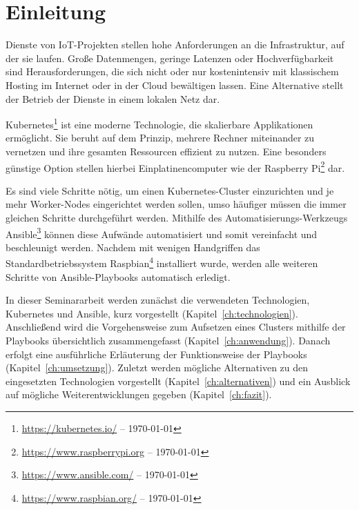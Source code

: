 \chapter{Einleitung}\label{ch:einleitung}

Dienste von IoT-Projekten stellen hohe Anforderungen an die Infrastruktur, auf der sie laufen.
Große Datenmengen, geringe Latenzen oder Hochverfügbarkeit sind Herausforderungen, die sich nicht oder nur kostenintensiv mit klassischem Hosting im Internet oder in der Cloud bewältigen lassen.
Eine Alternative stellt der Betrieb der Dienste in einem lokalen Netz dar.

Kubernetes\footnote{\url{https://kubernetes.io/} -- \today} ist eine moderne Technologie, die skalierbare Applikationen ermöglicht.
Sie beruht auf dem Prinzip, mehrere Rechner miteinander zu vernetzen und ihre gesamten Ressourcen effizient zu nutzen.
Eine besonders günstige Option stellen hierbei Einplatinencomputer wie der Raspberry Pi\footnote{\url{https://www.raspberrypi.org} -- \today} dar.

Es sind viele Schritte nötig, um einen Kubernetes-Cluster einzurichten und je mehr Worker-Nodes eingerichtet werden sollen, umso häufiger müssen die immer gleichen Schritte durchgeführt werden.
Mithilfe des Automatisierungs-Werkzeugs Ansible\footnote{\url{https://www.ansible.com/} -- \today} können diese Aufwände automatisiert und somit vereinfacht und beschleunigt werden.
Nachdem mit wenigen Handgriffen das Standardbetriebssystem Raspbian\footnote{\url{https://www.raspbian.org/} -- \today} installiert wurde, werden alle weiteren Schritte von Ansible-Playbooks automatisch erledigt.

In dieser Seminararbeit werden zunächst die verwendeten Technologien, Kubernetes und Ansible, kurz vorgestellt (Kapitel~\ref{ch:technologien}).
Anschließend wird die Vorgehensweise zum Aufsetzen eines Clusters mithilfe der Playbooks übersichtlich zusammengefasst (Kapitel~\ref{ch:anwendung}).
Danach erfolgt eine ausführliche Erläuterung der Funktionsweise der Playbooks (Kapitel~\ref{ch:umsetzung}).
Zuletzt werden mögliche Alternativen zu den eingesetzten Technologien vorgestellt (Kapitel~\ref{ch:alternativen}) und ein Ausblick auf mögliche Weiterentwicklungen gegeben (Kapitel~\ref{ch:fazit}).